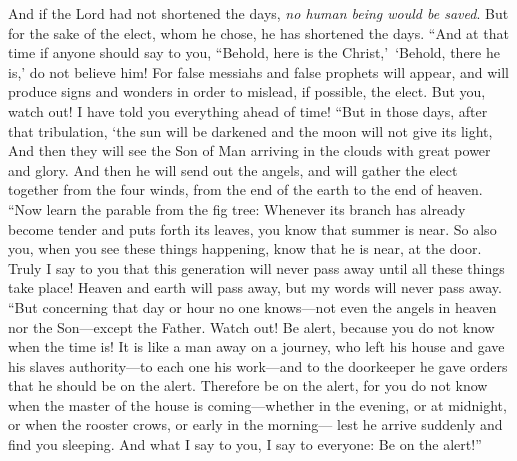 \begin{biblechapter}
\verse And if the Lord had not shortened the days, \textit{no human being would be saved}. But for the sake of the elect, whom he chose, he has shortened the days.
\verse “And at that time if anyone should say to you, “Behold, here is the Christ,’ ‘Behold, there he is,’ do not believe him!
\verse For false messiahs and false prophets will appear, and will produce signs and wonders in order to mislead, if possible, the elect.
\verse But you, watch out! I have told you everything ahead of time!
 “But in those days, after that tribulation,
\verse ‘the sun will be darkened 
and the moon will not give its light,
\verse And then they will see the Son of Man arriving in the clouds with great power and glory.
\verse And then he will send out the angels, and will gather the elect together from the four winds, from the end of the earth to the end of heaven.
 “Now learn the parable from the fig tree: Whenever its branch has already become tender and puts forth its leaves, you know that summer is near.
\verse So also you, when you see these things happening, know that he is near, at the door.
\verse Truly I say to you that this generation will never pass away until all these things take place!
\verse Heaven and earth will pass away, but my words will never pass away.
 “But concerning that day or hour no one knows—not even the angels in heaven nor the Son—except the Father.
\verse Watch out! Be alert, because you do not know when the time is!
\verse It is like a man away on a journey, who left his house and gave his slaves authority—to each one his work—and to the doorkeeper he gave orders that he should be on the alert.
\verse Therefore be on the alert, for you do not know when the master of the house is coming—whether in the evening, or at midnight, or when the rooster crows, or early in the morning—
\verse lest he arrive suddenly and find you sleeping.
\verse And what I say to you, I say to everyone: Be on the alert!”
\end{biblechapter}

